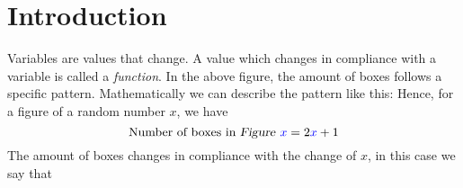 





\newpage
\section{Introduction}
Variables are values that change. A value which changes in compliance with a variable is called a \textit{function}.\vsk
{}
In the above figure, the amount of boxes follows a specific pattern. Mathematically we can describe the pattern like this:
Hence, for a figure of a random number $ x $, we have
\[ \text{Number of boxes in \textsl{Figure }}{\color{blue}x}=2{\color{blue}x}+1 \]
The amount of boxes changes in compliance with the change of $ x $, in this case we say that\regv
\st{}\regv

